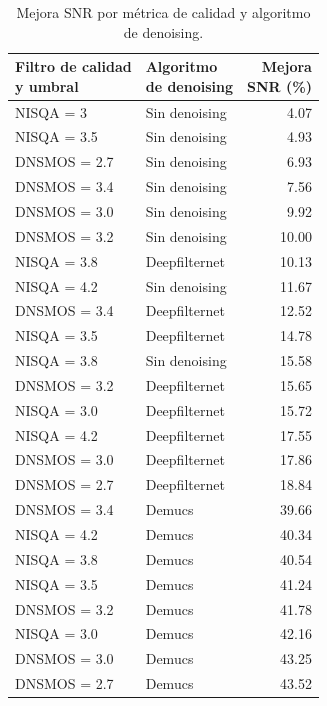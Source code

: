 \begin{table}[h]
\centering
\small
\caption{Mejora SNR por métrica de calidad y algoritmo de denoising.}
\label{tab:snr-improvement}
\begin{tabular}{@{} l l r @{}}
\toprule
\shortstack{\textbf{Filtro de calidad}\\\textbf{y umbral}} &
\shortstack{\textbf{Algoritmo}\\\textbf{de denoising}} &
\shortstack{\textbf{Mejora}\\\textbf{SNR (\%)}} \\
\midrule
NISQA = 3    & Sin denoising    & 4.07 \\
NISQA = 3.5  & Sin denoising    & 4.93 \\
DNSMOS = 2.7 & Sin denoising    & 6.93 \\
DNSMOS = 3.4 & Sin denoising    & 7.56 \\
DNSMOS = 3.0 & Sin denoising    & 9.92 \\
DNSMOS = 3.2 & Sin denoising    & 10.00 \\
NISQA = 3.8  & Deepfilternet    & 10.13 \\
NISQA = 4.2  & Sin denoising    & 11.67 \\
DNSMOS = 3.4 & Deepfilternet    & 12.52 \\
NISQA = 3.5  & Deepfilternet    & 14.78 \\
NISQA = 3.8  & Sin denoising    & 15.58 \\
DNSMOS = 3.2 & Deepfilternet    & 15.65 \\
NISQA = 3.0  & Deepfilternet    & 15.72 \\
NISQA = 4.2  & Deepfilternet    & 17.55 \\
DNSMOS = 3.0 & Deepfilternet    & 17.86 \\
DNSMOS = 2.7 & Deepfilternet    & 18.84 \\
DNSMOS = 3.4 & Demucs           & 39.66 \\
NISQA = 4.2  & Demucs           & 40.34 \\
NISQA = 3.8  & Demucs           & 40.54 \\
NISQA = 3.5  & Demucs           & 41.24 \\
DNSMOS = 3.2 & Demucs           & 41.78 \\
NISQA = 3.0  & Demucs           & 42.16 \\
DNSMOS = 3.0 & Demucs           & 43.25 \\
DNSMOS = 2.7 & Demucs           & 43.52 \\
\bottomrule
\end{tabular}
\end{table}


